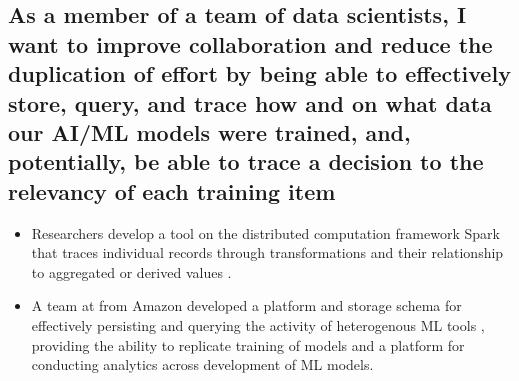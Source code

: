 \subsection{As a member of a team of data scientists, I want to improve collaboration and reduce the duplication of effort by being able to effectively store, query, and trace how and on what data our  AI/ML models were trained, and, potentially, be able to trace a decision to the relevancy of each training item}

\begin{itemize}
    \item Researchers develop a tool on the distributed computation framework Spark that traces individual records through transformations and their relationship to aggregated or derived values  \cite{Interlandi2017}.
    \item A team at from Amazon developed a platform and storage schema for effectively persisting and querying the activity of heterogenous ML tools \cite{Schelter2017}, providing the ability to replicate training of models and a platform for conducting analytics across development of ML models.
\end{itemize}
